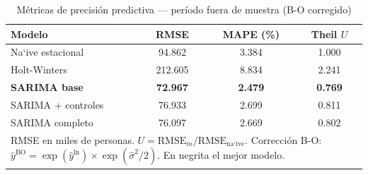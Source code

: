 \begin{table}[htbp]
\centering
\caption{M\'{e}tricas de precisi\'{o}n predictiva --- per\'{i}odo fuera de muestra (B-O corregido)}
\label{tab:metricas_5modelos}
\begin{tabular}{lccc}
\toprule
Modelo & RMSE & MAPE (\%) & Theil $U$ \\
\midrule
Na`{i}ve estacional  & 94.862 & 3.384 & 1.000 \\
Holt-Winters         & 212.605    & 8.834    & 2.241    \\
\textbf{SARIMA base} & \textbf{72.967} & \textbf{2.479} & \textbf{0.769} \\
SARIMA + controles   & 76.933  & 2.699  & 0.811  \\
SARIMA completo      & 76.097  & 2.669  & 0.802  \\
\bottomrule
\multicolumn{4}{p{0.72\textwidth}}{\footnotesize RMSE en miles de personas. $U = \text{RMSE}_m / \text{RMSE}_{\text{na`{i}ve}}$. Correcci\'{o}n B-O: $\hat{y}^{\text{BO}} = \exp(\hat{y}^{\ln}) \times \exp(\hat{\sigma}^2/2)$. En negrita el mejor modelo.}
\end{tabular}
\end{table}
